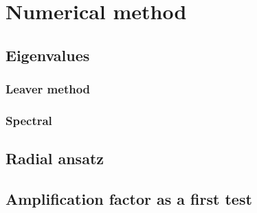 
\chapter{Numerical method} %
\label{Chapter4}


\section{Eigenvalues}

\subsection{Leaver method}
\subsection{Spectral}

\section{Radial ansatz}

\section{Amplification factor as a first test}


\cleardoublepage